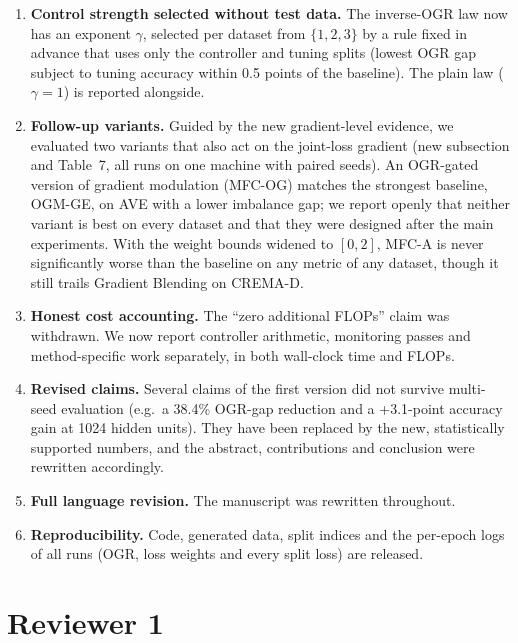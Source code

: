 \documentclass[11pt,a4paper]{article}
\begin{document}
\begin{enumerate}[leftmargin=*]
\item \textbf{Control strength selected without test data.} The inverse-OGR law now has an exponent $\gamma$, selected per dataset from $\{1,2,3\}$ by a rule fixed in advance that uses only the controller and tuning splits (lowest OGR gap subject to tuning accuracy within 0.5 points of the baseline). The plain law ($\gamma{=}1$) is reported alongside.
\item \textbf{Follow-up variants.} Guided by the new gradient-level evidence, we evaluated two variants that also act on the joint-loss gradient (new subsection and Table~7, all runs on one machine with paired seeds). An OGR-gated version of gradient modulation (MFC-OG) matches the strongest baseline, OGM-GE, on AVE with a lower imbalance gap; we report openly that neither variant is best on every dataset and that they were designed after the main experiments. With the weight bounds widened to $[0,2]$, MFC-A is never significantly worse than the baseline on any metric of any dataset, though it still trails Gradient Blending on CREMA-D.
\item \textbf{Honest cost accounting.} The ``zero additional FLOPs'' claim was withdrawn. We now report controller arithmetic, monitoring passes and method-specific work separately, in both wall-clock time and FLOPs.
\item \textbf{Revised claims.} Several claims of the first version did not survive multi-seed evaluation (e.g.\ a 38.4\% OGR-gap reduction and a +3.1-point accuracy gain at 1024 hidden units). They have been replaced by the new, statistically supported numbers, and the abstract, contributions and conclusion were rewritten accordingly.
\item \textbf{Full language revision.} The manuscript was rewritten throughout.
\item \textbf{Reproducibility.} Code, generated data, split indices and the per-epoch logs of all runs (OGR, loss weights and every split loss) are released.
\end{enumerate}

\section*{Reviewer 1}
\end{document}
